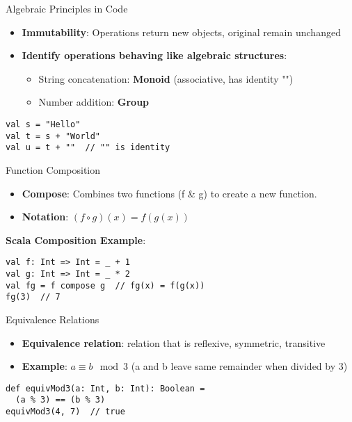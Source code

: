 \documentclass{beamer}
\begin{document}
\begin{frame}{Algebraic Principles in Code}
\begin{itemize}
    \item \textbf{Immutability}: Operations return new objects, original remain unchanged
    \item \textbf{Identify operations behaving like algebraic structures}:
    \begin{itemize}
        \item String concatenation: \textbf{Monoid} (associative, has identity "")
        \item Number addition: \textbf{Group}
    \end{itemize}
\end{itemize}

\begin{lstlisting}
val s = "Hello"
val t = s + "World"
val u = t + ""  // "" is identity
\end{lstlisting}
\end{frame}

\begin{frame}{Function Composition}
\begin{itemize}
    \item \textbf{Compose}: Combines two functions (f \& g) to create a new function.
    \item \textbf{Notation}: $(f \circ g)(x) = f(g(x))$
\end{itemize}

\textbf{Scala Composition Example}:
\begin{lstlisting}
val f: Int => Int = _ + 1
val g: Int => Int = _ * 2
val fg = f compose g  // fg(x) = f(g(x))
fg(3)  // 7
\end{lstlisting}
\end{frame}

\begin{frame}{Equivalence Relations}
\begin{itemize}
    \item \textbf{Equivalence relation}: relation that is reflexive, symmetric, transitive
    \item \textbf{Example}: $a \equiv b \mod 3$ (a and b leave same remainder when divided by 3)
\end{itemize}

\begin{lstlisting}
def equivMod3(a: Int, b: Int): Boolean = 
  (a % 3) == (b % 3)
equivMod3(4, 7)  // true
\end{lstlisting}
\end{frame}
\end{document}
